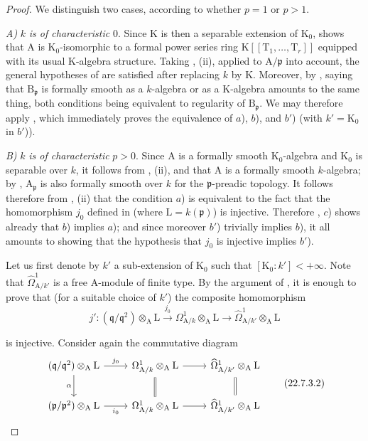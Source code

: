 \begin{proof}
We distinguish two cases, according to whether $p=1$ or $p>1$.

\emph{A)} $k$ \emph{is of characteristic} $0$.
Since $\mathrm{K}$ is then a separable extension of $\mathrm{K}_0$,
 shows that $\mathrm{A}$ is $\mathrm{K}_0$-isomorphic to a
formal power series ring $\mathrm{K}[[\mathrm{T}_1,\ldots,\mathrm{T}_r]]$
equipped with its usual $\mathrm{K}$-algebra structure. Taking
, (ii), applied to $\mathrm{A}/\mathfrak{p}$ into account, the
general hypotheses of  are satisfied after replacing $k$ by
$\mathrm{K}$. Moreover, by , saying that
$\mathrm{B}_\mathfrak{p}$ is formally smooth as a $k$-algebra or as a
$\mathrm{K}$-algebra amounts to the same thing, both conditions being
equivalent to regularity of $\mathrm{B}_\mathfrak{p}$. We may therefore apply
, which immediately proves the equivalence of $a$), $b$), and
$b'$) (with $k'=\mathrm{K}_0$ in $b'$)).

\emph{B)} $k$ \emph{is of characteristic} $p>0$.
Since $\mathrm{A}$ is a formally smooth $\mathrm{K}_0$-algebra and
$\mathrm{K}_0$ is separable over $k$, it follows from , (ii),
and  that $\mathrm{A}$ is a formally smooth $k$-algebra; by
, $\mathrm{A}_\mathfrak{p}$ is also formally smooth over $k$
for the $\mathfrak{p}$-preadic topology.
It follows therefore from , (ii) that the condition $a$) is equivalent to the fact that the homomorphism $j_0$ defined in  (where $\mathrm{L}=k(\mathfrak{p})$) is injective.
Therefore , $c$) shows already that $b$) implies $a$); and since moreover $b'$) trivially implies $b$), it all amounts to showing that the hypothesis that $j_0$ is injective implies $b'$).

Let us first denote by $k'$ a sub-extension of $\mathrm{K}_0$ such that $[\mathrm{K}_0:k']<+\infty$.
Note that $\widehat{\Omega}^1_{\mathrm{A}/k'}$ is a free $\mathrm{A}$-module of finite type.
By the argument of , it is enough to prove that (for a suitable
choice of $k'$) the composite homomorphism
\[
\label{0.22.7.3.1}
  j':(\mathfrak{q}/\mathfrak{q}^2)\otimes_\mathrm{A}\mathrm{L}\xrightarrow{j_0}\Omega^1_{\mathrm{A}/k}\otimes_\mathrm{A}\mathrm{L}\to\widehat{\Omega}^1_{\mathrm{A}/k'}\otimes_\mathrm{A}\mathrm{L}
  \tag{22.7.3.1}
\]


is injective.
Consider again the commutative diagram
\[
\label{0.22.7.3.2}
  \begin{tikzcd}
    (\mathfrak{q}/\mathfrak{q}^2)\otimes_\mathrm{A}\mathrm{L}
      \ar[r,"j_0"] \ar[d,"\alpha"'] &
    \Omega^1_{\mathrm{A}/k}\otimes_\mathrm{A}\mathrm{L}
      \ar[r] \ar[d,equal] &
    \widehat{\Omega}^1_{\mathrm{A}/k'}\otimes_\mathrm{A}\mathrm{L}
      \ar[d,equal]\\
    (\mathfrak{p}/\mathfrak{p}^2)\otimes_\mathrm{A}\mathrm{L}
      \ar[r,"i_0"'] &
    \Omega^1_{\mathrm{A}/k}\otimes_\mathrm{A}\mathrm{L} \ar[r] &
    \widehat{\Omega}^1_{\mathrm{A}/k'}\otimes_\mathrm{A}\mathrm{L}
  \end{tikzcd}
  \tag{22.7.3.2}
\]


\end{proof}
